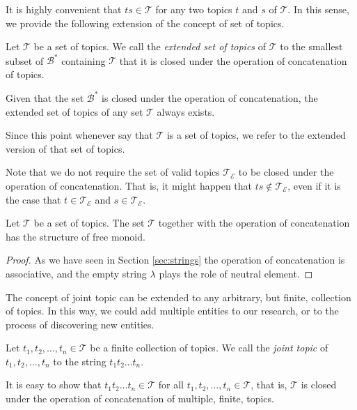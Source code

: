It is highly convenient that $ts \in \mathcal{T}$ for any two topics $t$ and $s$ of $\mathcal{T}$. In this sense, we provide the following extension of the concept of set of topics.

\begin{definition}
\label{def:descriptions_extended_topics}
Let $\mathcal{T}$ be a set of topics. We call the \emph{extended set of topics} of $\mathcal{T}$ to the smallest subset of $\mathcal{B}^\ast$ containing $\mathcal{T}$ that it is closed under the operation of concatenation of topics.
\end{definition}

Given that the set $\mathcal{B}^\ast$ is closed under the operation of concatenation, the extended set of topics of any set $\mathcal{T}$ always exists.

\begin{notation}
Since this point whenever say that $\mathcal{T}$ is a set of topics, we refer to the extended version of that set of topics.
\end{notation}

Note that we do not require the set of valid topics $\mathcal{T}_\mathcal{E}$ to be closed under the operation of concatenation. That is, it might happen that $ts \notin \mathcal{T}_\mathcal{E}$, even if it is the case that $t \in \mathcal{T}_\mathcal{E}$ and $s \in \mathcal{T}_\mathcal{E}$.

\begin{proposition}
Let $\mathcal{T}$ be a set of topics. The set $\mathcal{T}$ together with the operation of concatenation has the structure of free monoid.
\end{proposition}
\begin{proof}
As we have seen in Section \ref{sec:strings} the operation of concatenation is associative, and the empty string $\lambda$ plays the role of neutral element.
\end{proof}

The concept of joint topic can be extended to any arbitrary, but finite, collection of topics. In this way, we could add multiple entities to our research, or to the process of discovering new entities.

\begin{definition}
Let $t_1, t_2, \ldots, t_n \in \mathcal{T}$ be a finite collection of topics. We call the \emph{joint topic} of $t_1, t_2, \ldots, t_n$ to the string $t_1 t_2 \ldots t_n$.
\end{definition}

It is easy to show that $t_1 t_2 \ldots t_n \in \mathcal{T}$ for all $t_1, t_2, \ldots, t_n \in \mathcal{T}$, that is, $\mathcal{T}$ is closed under the operation of concatenation of multiple, finite, topics.

